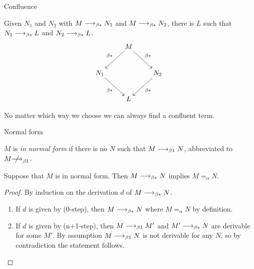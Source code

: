 \begin{frame}{Confluence}
\begin{theorem}
  Given $N_1$ and $N_2$ with $M \longrightarrow_{\beta*} N_1$ and $M\longrightarrow_{\beta*} N_2$, there is $L$
  such that $N_1 \longrightarrow_{\beta*} L$ and $N_2 \longrightarrow_{\beta*} L$. 
  \[
    \xymatrix{
      & M \ar[rd]^{\beta*} \ar[ld]_{\beta*} \\
      N_1 \ar[rd]_{\beta*} & & N_2 \ar[ld]^{\beta*} \\
      & L
    }
  \]
\end{theorem}

No matter which way we choose we can always find a confluent
term. 

\end{frame}

\begin{frame}{Normal form}
  \begin{definition}
    $M$ is \emph{in normal form} if 
    there is no $N$ such that $M \longrightarrow_{\beta1} N$, abbreviated to $M \notonereduce$.
    
  \end{definition}
  \begin{lemma}
    Suppose that $M$ is in normal form. Then 
      $M \longrightarrow_{\beta*} N$ implies $M =_\alpha N$.
  \label{lem:normal-no-reduction}%
  \end{lemma}
  \begin{proof}
    By induction on the derivation $d$ of $M \longrightarrow_{\beta*} N$.
    \begin{enumerate}
      \item If $d$ is given by (0-step), then
        $M \longrightarrow_{\beta*} N$ where $M =_\alpha N$ by definition.

      \item If $d$ is given by (n+1-step), then
        $M \longrightarrow_{\beta1} M'$ and $M' \longrightarrow_{\beta*} N$ are derivable for some $M'$. By
        assumption $M \longrightarrow_{\beta1} N$ is not derivable for any $N$, so by
        contradiction the statement follows.
    \end{enumerate}
  \end{proof}

\end{frame}

